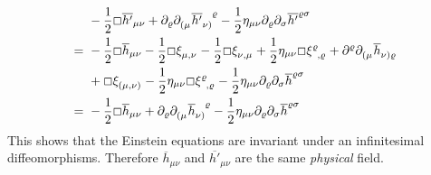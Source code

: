 \begin{equation}
    \begin{split}
        & -\frac{1}{2} \Box \overline{h'}_{\mu\nu} + \partial_\varrho \tensor{\partial}{_(_\mu}\tensor{\overline{h'}}{_\nu_)^\varrho}
        - \frac{1}{2} \eta_{\mu\nu}\partial_\varrho\partial_\sigma \overline{h'}^{\varrho\sigma} \\
        =\ & -\frac{1}{2}\Box\overline{h}_{\mu\nu} - {\frac{1}{2}\Box\tensor{\xi}{_\mu_,_\nu}}
        -{\frac{1}{2}\Box\tensor{\xi}{_\nu_,_\mu}}
        + {\frac{1}{2} \eta_{\mu\nu}\Box\tensor{\xi}{^\varrho_,_\varrho}}
        + \partial^\varrho \tensor{\partial}{_(_\mu}\tensor{\overline{h}}{_\nu_)_\varrho} \\
        & + {\Box\tensor{\xi}{_(_\mu_,_\nu_)}}
        - {\frac{1}{2}\eta_{\mu\nu}\Box\tensor{\xi}{^\varrho_,_\varrho}}
        - \frac{1}{2} \eta_{\mu\nu}\partial_\varrho\partial_\sigma \overline{h}^{\varrho\sigma} \\
        =\ & -\frac{1}{2} \Box \overline{h}_{\mu\nu} + \partial_\varrho \tensor{\partial}{_(_\mu}\tensor{\overline{h}}{_\nu_)^\varrho}
        - \frac{1}{2} \eta_{\mu\nu}\partial_\varrho\partial_\sigma \overline{h}^{\varrho\sigma}
    \end{split}
\end{equation}
This shows that the Einstein equations are invariant under an infinitesimal diffeomorphisms.
Therefore $\overline{h}_{\mu\nu}$ and $\overline{h'}_{\mu\nu}$ are the same \emph{physical} field.

